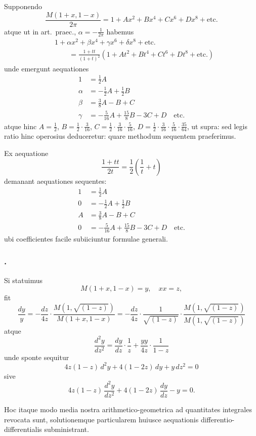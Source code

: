 \documentclass[12pt,a4paper]{article}
\begin{document}
Supponendo
\[
\frac{M(1+x,1-x)}{2\pi} = 1 + Ax^2 + Bx^4 + Cx^6 + Dx^8 + \text{etc.}
\]
atque ut in art.\ praec., $\alpha = -\frac{1}{2\pi}$ habemus
\[
\begin{aligned}
&1 + \alpha x^2 + \beta x^4 + \gamma x^6 + \delta x^8 + \text{etc.} \\
&\qquad = \frac{1+tt}{(1+t)^2}\left(1 + At^2 + Bt^4 + Ct^6 + Dt^8 + \text{etc.}\right)
\end{aligned}
\]
unde emergunt aequationes
\[
\begin{aligned}
1 &= \tfrac{1}{2}A \\
\alpha &= -\tfrac{1}{2}A + \tfrac{1}{2}B \\
\beta &= \tfrac{3}{8}A - B + C \\
\gamma &= -\tfrac{5}{16}A + \tfrac{15}{8}B - 3C + D \quad\text{etc.}
\end{aligned}
\]
atque hinc $A = \frac{1}{2}$, $B = \frac{1}{2}\cdot\frac{3}{16}$, $C = \frac{1}{2}\cdot\frac{3}{16}\cdot\frac{5}{16}$, $D = \frac{1}{2}\cdot\frac{3}{16}\cdot\frac{5}{16}\cdot\frac{35}{64}$, ut supra: sed legis ratio hinc operosius deduceretur: quare methodum sequentem praeferimus.

Ex aequatione
\[
\frac{1+tt}{2t} = \frac{1}{2}\left(\frac{1}{t}+t\right)
\]
demanant aequationes sequentes:
\[
\begin{aligned}
1 &= \tfrac{1}{2}A \\
0 &= -\tfrac{1}{2}A + \tfrac{1}{2}B \\
A &= \tfrac{3}{8}A - B + C \\
0 &= -\tfrac{5}{16}A + \tfrac{15}{8}B - 3C + D \quad\text{etc.}
\end{aligned}
\]
ubi coefficientes facile subiiciuntur formulae generali.

\subsubsection*{.}

Si statuimus
\[
M(1+x,1-x) = y, \quad xx = z,
\]
fit
\[
\frac{dy}{y} = -\frac{dz}{4z}\cdot\frac{M(1,\sqrt{(1-z)})}{M(1+x,1-x)} = -\frac{dz}{4z}\cdot\frac{1}{\sqrt{(1-z)}}\cdot\frac{M(1,\sqrt{(1-z)})}{M(1,\sqrt{(1-z)})}
\]
atque
\[
\frac{d^2y}{dz^2} = \frac{dy}{dz}\cdot\frac{1}{z} + \frac{yy}{4z}\cdot\frac{1}{1-z}
\]
unde sponte sequitur
\[
4z(1-z)\,d^2y + 4(1-2z)\,dy + y\,dz^2 = 0
\]
sive
\[
4z(1-z)\,\frac{d^2y}{dz^2} + 4(1-2z)\,\frac{dy}{dz} - y = 0.
\]

Hoc itaque modo media nostra arithmetico-geometrica ad quantitates integrales revocata sunt, solutionemque particularem huiusce aequationis differentio-differentialis subministrant.
\end{document}
